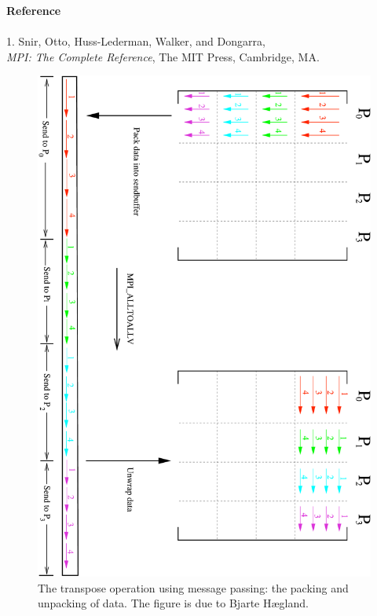 \documentclass[11pt]{article}
\begin{document}
\vspace{1.in}

{\bf Reference}\\
\\
1. Snir, Otto, Huss-Lederman, Walker, and Dongarra,\\
{\em MPI: The Complete Reference}, The MIT Press, Cambridge, MA.

 \begin{figure}[htbp]
  \begin{center}
    \includegraphics[scale=0.6]{matrix_blocktranspose}
  \end{center}
  \caption{
The transpose operation using message passing: 
the packing and unpacking of data.
The figure is due to Bjarte H{\ae}gland.
}
\label{}
\end{figure}
\end{document}
